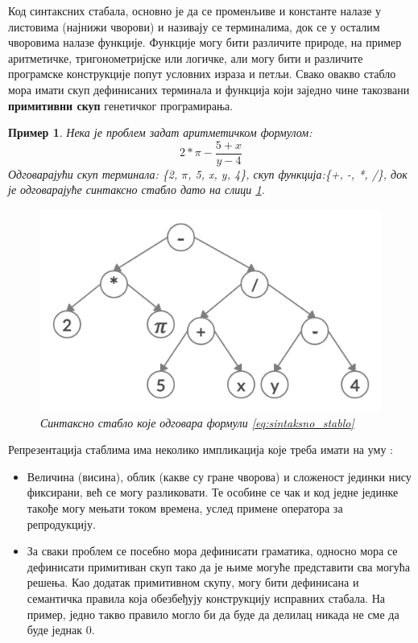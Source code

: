 \documentclass[a4paper]{article}
\newtheorem{primer}{Пример}[section] %
\begin{document}
Код синтаксних стабала, основно је да се променљиве и константе налазе у листовима (најнижи чворови) и називају се терминалима, док се у осталим чворовима налазе функције. Функције могу бити различите природе, на пример аритметичке, тригонометријске или логичке, али могу бити и различите програмске конструкције попут условних израза и петљи. Свако овакво стабло мора имати скуп дефинисаних терминала и функција који заједно чине такозвани \textbf{примитивни скуп} генетичког програмирања. 

\begin{primer}
    Нека је проблем задат аритметичком формулом: 
    \begin{equation} 
        \label{eq:sintaksno_stablo}
        2*\pi-\frac{5+x}{y-4}
    \end{equation}
    Одговарајући скуп терминала: \{2, $\pi$, 5, x, y, 4\}, скуп функција:\newline \{+, -, *, /\}, док је одговарајуће синтаксно стабло дато на слици \ref{fig:sintaksno_stablo}.

    \begin{figure}[h!]
        \begin{center}
        \includegraphics[scale=0.22]{sintaksnoStablo.png}
        \end{center}
        \caption{Синтаксно стабло које одговара формули \eqref{eq:sintaksno_stablo}}
        \label{fig:sintaksno_stablo}
    \end{figure}
\end{primer}


Репрезентација стаблима има неколико импликација које треба имати на уму \cite{compIntelligence}:
\begin{itemize}
    \item Величина (висина), облик (какве су гране чворова) и сложеност јединки нису фиксирани, већ се могу разликовати. Те особине се чак и код једне јединке такође могу мењати током времена, услед примене оператора за репродукцију.
    \item За сваки проблем се посебно мора дефинисати граматика, односно мора се дефинисати примитиван скуп тако да је њиме могуће представити сва могућа решења. Као додатак примитивном скупу, могу бити дефинисана и семантичка правила која обезбеђују конструкцију исправних стабала. На пример, једно такво правило могло би да буде да делилац никада не сме да буде једнак 0.
\end{itemize}
\end{document}
